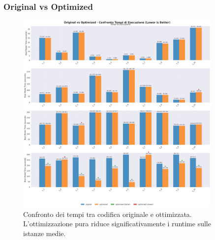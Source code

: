 \documentclass[11pt,a4paper]{article}
\begin{document}
\subsubsection{Original vs Optimized}
\begin{figure}[H]
  \centering
  \includegraphics[width=0.9\textwidth]{../Results/graphs/time_comparison_original_vs_optimized.png}
  \caption{Confronto dei tempi tra codifica originale e ottimizzata. 
  L’ottimizzazione pura riduce significativamente i runtime sulle istanze medie.}
\end{figure}
\end{document}
